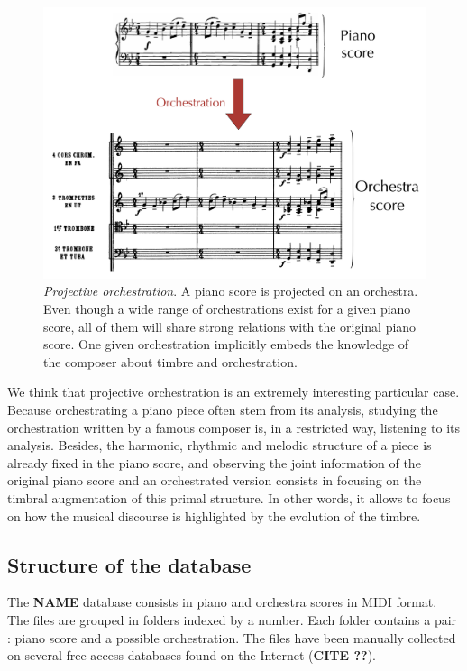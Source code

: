 \documentclass[twoside,twocolumn]{article}
\begin{document}
\begin{figure}
\centering
\includegraphics[scale=0.12]{orch}
\caption{\textit{Projective orchestration}. A piano score is projected on an orchestra. Even though a wide range of orchestrations exist for a given piano score, all of them will share strong relations with the original piano score. One given orchestration implicitly embeds the knowledge of the composer about timbre and orchestration.}
\label{fig:orch}
\end{figure}

We think that projective orchestration is an extremely interesting particular case. Because orchestrating a piano piece often stem from its analysis, studying the orchestration written by a famous composer is, in a restricted way, listening to its analysis. Besides, the harmonic, rhythmic and melodic structure of a piece is already fixed in the piano score, and observing the joint information of the original piano score and an orchestrated version consists in focusing on the timbral augmentation of this primal structure. In other words, it allows to focus on how the musical discourse is highlighted by the evolution of the timbre.

\subsection{Structure of the database}
The \textbf{NAME} database consists in piano and orchestra scores in MIDI format.
The files are grouped in folders indexed by a number. Each folder contains a pair : piano score and a possible orchestration. 
The files have been manually collected on several free-access databases found on the Internet (\textbf{CITE ??}).
\end{document}
